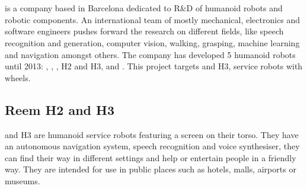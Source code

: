 \section{\company}
\company is a company based in Barcelona dedicated to R\&D of humanoid robots and robotic components. 
An international team of mostly mechanical, electronics and software engineers pushes forward the research on different fields, like speech recognition and generation, computer vision, walking, grasping, machine learning and navigation amongst others.
The company has developed 5 humanoid robots until 2013: , , , H2 and H3, and .
This project targets  and H3, service robots with wheels.

\subsection*{Reem H2 and H3}
  and H3  are humanoid service robots featuring a screen on their torso.
They have an autonomous navigation system, speech recognition and voice synthesiser, they can find their way in different settings and help or entertain people in a friendly way.
They are intended for use in public places such as hotels, malls, airports or museums.

